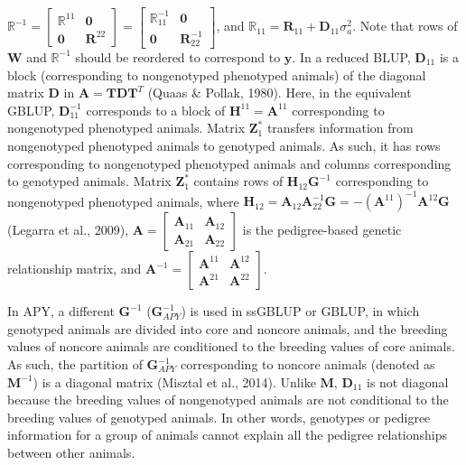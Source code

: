 \documentclass[authordate, empirical]{jote-new-article}
\begin{document}
\noindent$\mathbb{R}^{-1}=\begin{bmatrix}\mathbb{R}^{11}&\textbf{0}\\\textbf{0}&\textbf{R}^{22}\end{bmatrix}=\begin{bmatrix}\mathbb{R}_{11}^{-1}&\textbf{0}\\\textbf{0}&\textbf{R}_{22}^{-1}\end{bmatrix}$, and $\mathbb{R}_{11}=\textbf{R}_{11}+\textbf{D}_{11}\sigma_a^2$. Note that rows of $\textbf{W}$ and $\mathbb{R}^{-1}$ should be reordered to correspond to $\textbf{y}$. In a reduced BLUP, $\textbf{D}_{11}$ is a block (corresponding to nongenotyped phenotyped animals) of the diagonal matrix $\textbf{D}$ in $\textbf{A}=\textbf{TDT}^T$ (Quaas \& Pollak, 1980). Here, in the equivalent GBLUP, $\textbf{D}_{11}^{-1}$ corresponds to a block of $\textbf{H}^{11}=\textbf{A}^{11}$ corresponding to nongenotyped phenotyped animals. Matrix $\textbf{Z}_1^*$ transfers information from nongenotyped phenotyped animals to genotyped animals. As such, it has rows corresponding to nongenotyped phenotyped animals and columns corresponding to genotyped animals. Matrix $\textbf{Z}_1^*$ contains rows of $\textbf{H}_{12} \textbf{G}^{-1}$ corresponding to nongenotyped phenotyped animals, where $\textbf{H}_{12}=\textbf{A}_{12} \textbf{A}_{22}^{-1} \textbf{G}=-(\textbf{A}^{11} )^{-1} \textbf{A}^{12} \textbf{G}$ (Legarra et al., 2009), $\textbf{A}=\begin{bmatrix}\textbf{A}_{11}&\textbf{A}_{12}\\\textbf{A}_{21}&\textbf{A}_{22}\end{bmatrix}$ is the pedigree-based genetic relationship matrix, and $\textbf{A}^{-1}=\begin{bmatrix}\textbf{A}^{11}&\textbf{A}^{12}\\\textbf{A}^{21}&\textbf{A}^{22}\end{bmatrix}$.



	In APY, a different $\textbf{G}^{-1}$ ($\textbf{G}_{\textit{APY}} ^{-1}$) is used in ssGBLUP or GBLUP, in which genotyped animals are divided into core and noncore animals, and the breeding values of noncore animals are conditioned to the breeding values of core animals. As such, the partition of $\textbf{G}_{\textit{APY}} ^{-1}$ corresponding to noncore animals (denoted as $\textbf{M}^{-1}$) is a diagonal matrix (Misztal et al., 2014). Unlike $\textbf{M}$, $\textbf{D}_{11}$ is not diagonal because the breeding values of nongenotyped animals are not conditional to the breeding values of genotyped animals. In other words, genotypes or pedigree information for a group of animals cannot explain all the pedigree relationships between other animals.
\end{document}
